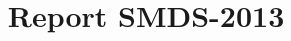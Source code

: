 \documentclass[]{report}
\title{Report SMDS-2013}
\author{}
\begin{document}
\maketitle

\begin{abstract}
\end{abstract}
\end{document}
